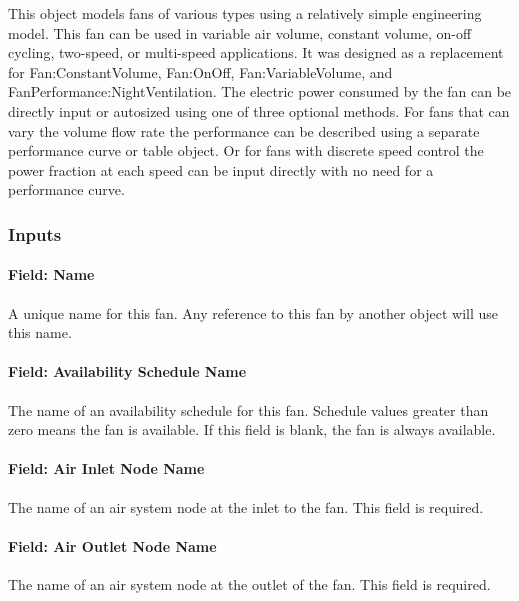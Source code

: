 This object models fans of various types using a relatively simple engineering model. This fan can be used in variable air volume, constant volume, on-off cycling, two-speed, or multi-speed applications.  It was designed as a replacement for Fan:ConstantVolume, Fan:OnOff, Fan:VariableVolume, and FanPerformance:NightVentilation. The electric power consumed by the fan can be directly input or autosized using one of three optional methods.  For fans that can vary the volume flow rate the performance can be described using a separate performance curve or table object. Or for fans with discrete speed control the power fraction at each speed can be input directly with no need for a performance curve.  

\subsubsection{Inputs}\label{inputs-fansysmodel}

\paragraph{Field: Name}\label{field-name-fansysmodel}

A unique name for this fan.  Any reference to this fan by another object will use this name.

\paragraph{Field: Availability Schedule Name}\label{field-availsched-fansysmodel}

The name of an availability schedule for this fan. Schedule values greater than zero means the fan is available. If this field is blank, the fan is always available.

\paragraph{Field: Air Inlet Node Name}\label{field-air-inlet-node-name-fansysmodel}

The name of an air system node at the inlet to the fan. This field is required. 

\paragraph{Field: Air Outlet Node Name}\label{field-air-outlet-node-name-fansysmodel}

The name of an air system node at the outlet of the fan.  This field is required.


